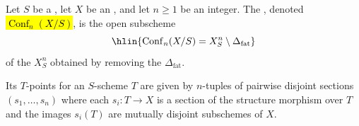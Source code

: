 \begin{definition} \label{definition:ordered_configuration_space_of_n_points_in_a_scheme_over_a_scheme}
Let $S$ be a , let $X$ be an , and let $n \geq 1$ be an integer. The , denoted \hl{$\operatorname{Conf}_n(X/S)$}, is the open subscheme
$$\hlin{\operatorname{Conf}_n(X/S) = X^n_S \setminus \Delta_{\mathrm{fat}}}$$
of the  $X^n_S$ obtained by removing the  $\Delta_{\mathrm{fat}}$.

Its $T$-points for an $S$-scheme $T$ are given by $n$-tuples of pairwise disjoint sections $(s_1, \dots, s_n)$ where each $s_i \colon T \to X$ is a section of the structure morphism over $T$ and the images $s_i(T)$ are mutually disjoint subschemes of $X$.
\end{definition}
